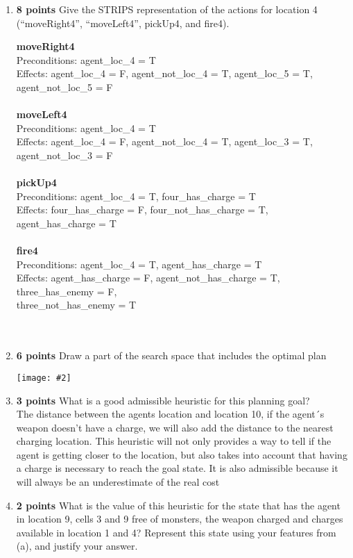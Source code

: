 \documentclass{article}
\def\ans#1{{\color{ans}#1}}
\newcommand{\centerfig}[2]{\begin{center}\texttt{[image: \#2]}\end{center}}
\begin{document}
\begin{enumerate}[label=(\alph*)]
    \item \textbf{8 points} Give the STRIPS representation of the actions for location 4 (“moveRight4”, “moveLeft4”,
pickUp4, and fire4). 

\ans{
        \textbf{moveRight4}\\
        Preconditions:  agent\_loc\_4 = T\\
        Effects: agent\_loc\_4 = F,  agent\_not\_loc\_4 = T,   agent\_loc\_5 = T, 					agent\_not\_loc\_5 = F\\\\
        \textbf{moveLeft4}\\
        Preconditions:  agent\_loc\_4 = T \\
        Effects: agent\_loc\_4 = F,  agent\_not\_loc\_4 = T,   agent\_loc\_3 = T, 					agent\_not\_loc\_3 = F\\\\
        \textbf{pickUp4}\\
        Preconditions:  agent\_loc\_4 = T, four\_has\_charge = T\\
        Effects: four\_has\_charge = F, four\_not\_has\_charge = T, 				   						agent\_has\_charge = T \\\\
        \textbf{fire4}\\
        Preconditions: agent\_loc\_4 = T, agent\_has\_charge = T \\
        Effects: agent\_has\_charge = F,  agent\_not\_has\_charge = T, 					  				three\_has\_enemy = F,\\ three\_not\_has\_enemy = T	 \\\\
    }  \\

    \item \textbf{6 points} Draw a part of the search space that includes the optimal plan
    \centerfig{0.5}{../figs/1-c.png}
    \item \textbf{3 points} What is a good admissible heuristic for this planning goal? \\
    \ans{
        The distance between the agents location and location 10, if the agent´s weapon doesn't have a charge, we will also add the distance to the nearest charging location. This heuristic will not only provides a way to tell if the agent is getting closer to the location, but also takes into account that having a charge is necessary to reach the goal state. It is also admissible because it will always be an underestimate of the real cost
    }  \\
    \item \textbf{2 points} What is the value of this heuristic for the state that has the agent in location 9, cells 3 and 9
free of monsters, the weapon charged and charges available in location 1 and 4? Represent this state using
your features from (a), and justify your answer. \\ 


\end{enumerate}
\end{document}
